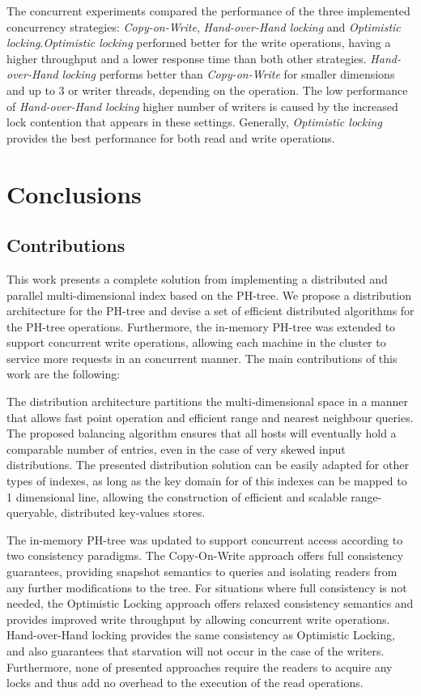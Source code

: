 \documentclass[11pt,a4paper]{globis-book}
\begin{document}
The concurrent experiments compared the performance of the three implemented concurrency strategies: \textit{Copy-on-Write}, \textit{Hand-over-Hand locking} and \textit{Optimistic locking}.\textit{Optimistic locking} performed better for the write operations, having a higher throughput and a lower response time than both other strategies. \textit{Hand-over-Hand locking} performs better than \textit{Copy-on-Write} for smaller dimensions and up to 3 or writer threads, depending on the operation. The low performance of \textit{Hand-over-Hand locking} higher number of writers is caused by the increased lock contention that appears in these settings. Generally, \textit{Optimistic locking} provides the best performance for both read and write operations.

\chapter{Conclusions}
\label{ch:conclusions}

\section{Contributions}
\label{sec:conclusions-contribution}

This work presents a complete solution from implementing a distributed and parallel multi-dimensional index based on the PH-tree. We propose a distribution architecture for the PH-tree and devise a set of efficient distributed algorithms for the PH-tree operations. Furthermore, the in-memory PH-tree was extended to support concurrent write operations, allowing each machine in the cluster to service more requests in an concurrent manner. The main contributions of this work are the following:

The distribution architecture partitions the multi-dimensional space in a manner that allows fast point operation and efficient range and nearest neighbour queries. The proposed balancing algorithm ensures that all hosts will eventually hold a comparable number of entries, even in the case of very skewed input distributions. The presented distribution solution can be easily adapted for other types of indexes, as long as the key domain for of this indexes can be mapped to 1 dimensional line, allowing the construction of efficient and scalable range-queryable, distributed key-values stores.

The in-memory PH-tree was updated to support concurrent access according to two consistency paradigms. The Copy-On-Write approach offers full consistency guarantees, providing snapshot semantics to queries and isolating readers from any further modifications to the tree. For situations where full consistency is not needed, the Optimistic Locking approach offers relaxed consistency semantics and provides improved write throughput by allowing concurrent write operations. Hand-over-Hand locking provides the same consistency as Optimistic Locking, and also guarantees that starvation will not occur in the case of the writers. Furthermore, none of presented approaches require the readers to acquire any locks and thus add no overhead to the execution of the read operations. 
\end{document}
